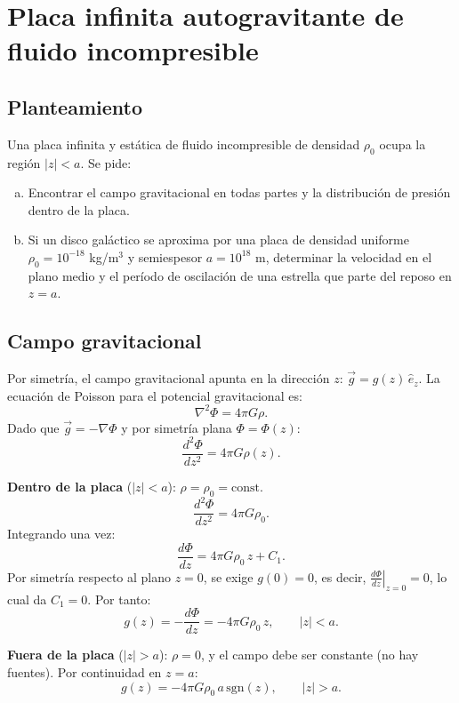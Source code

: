 \figuraEnvolventeSolar

\section{Placa infinita autogravitante de fluido incompresible}

\subsection{Planteamiento}

Una placa infinita y estática de fluido incompresible de densidad $\rho_0$ ocupa la región $|z| < a$. Se pide:
\begin{enumerate}[(a)]
    \item Encontrar el campo gravitacional en todas partes y la distribución de presión dentro de la placa.
    \item Si un disco galáctico se aproxima por una placa de densidad uniforme $\rho_0 = 10^{-18}$ kg/m$^3$ y semiespesor $a = 10^{18}$ m, determinar la velocidad en el plano medio y el período de oscilación de una estrella que parte del reposo en $z = a$.
\end{enumerate}

\subsection{Campo gravitacional}

Por simetría, el campo gravitacional apunta en la dirección $z$: $\vec{g} = g(z)\,\hat{e}_z$. La ecuación de Poisson para el potencial gravitacional es:
$$
\nabla^2\Phi = 4\pi G\rho.
$$
Dado que $\vec{g} = -\nabla\Phi$ y por simetría plana $\Phi = \Phi(z)$:
$$
\frac{d^2\Phi}{dz^2} = 4\pi G\rho(z).
$$

\textbf{Dentro de la placa} ($|z| < a$): $\rho = \rho_0 = \text{const}$.
$$
\frac{d^2\Phi}{dz^2} = 4\pi G\rho_0.
$$
Integrando una vez:
$$
\frac{d\Phi}{dz} = 4\pi G\rho_0\,z + C_1.
$$
Por simetría respecto al plano $z = 0$, se exige $g(0) = 0$, es decir, $\left.\frac{d\Phi}{dz}\right|_{z=0} = 0$, lo cual da $C_1 = 0$. Por tanto:
$$
g(z) = -\frac{d\Phi}{dz} = -4\pi G\rho_0\,z, \qquad |z| < a.
$$

\textbf{Fuera de la placa} ($|z| > a$): $\rho = 0$, y el campo debe ser constante (no hay fuentes). Por continuidad en $z = a$:
$$
g(z) = -4\pi G\rho_0\,a\,\text{sgn}(z), \qquad |z| > a.
$$

